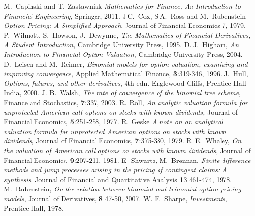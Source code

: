 \documentclass[letterpaper,12pt]{article}
\theoremstyle{plain}
\numberwithin{equation}{section}
\begin{document}
\begin{thebibliography}{99}

 M.~Capinski and T.~Zastawniak {\em Mathematics for Finance, An Introduction to Financial Engineering}, Springer, 2011.
 J.C.~Cox, S.A.~Ross and M.~Rubenstein {\em Option Pricing: A Simplified Approach}, Journal of Financial Economics 7, 1979.
 P.~Wilmott, S.~Howson, J.~Dewynne, {\em The Mathematics of Financial Derivatives, A Student Introduction}, Cambridge University Press, 1995.
 D. J.~Higham, {\em An Introduction to Financial Option Valuation}, Cambridge University Press, 2004.
 D.~Leisen and M.~Reimer, {\em Binomial models for option valuation, examining and improving convergence}, Applied Mathematical Finance, {\textbf 3}:319-346, 1996.
 J.~Hull, {\em Options, futures, and other derivatives}, 4th edn. Englewood Cliffs, Prentice Hall India, 2000.
 J. B.~Walsh, {\em The rate of convergence of the binomial tree scheme}, Finance and Stochastics, {\textbf 7}:337, 2003.
 R.~Roll, {\em An analytic valuation formula for unprotected American call
options on stocks with known dividends,} Journal of Financial Economics, {\textbf 5}:251-258, 1977.
 R.~Geske {\em A note on an analytical valuation formula for unprotected
American options on stocks with known dividends}, Journal of Financial Economics, {\textbf 7}:375-380, 1979.
 R. E.~Whaley, {\em On the valuation of American call options on stocks with known dividends}, Journal of Financial Economics, {\textbf 9}:207-211, 1981.
 E.~Shwartz, M.~Brennan, {\em Finite difference methods and jump processes arising in the pricing of contingent claims: A synthesis}, Journal of Financial and Quantitative Analysis {\textbf 13} 461-474, 1978.
 M.~Rubenstein, {\em On the relation between binomial and trinomial option pricing models}, Journal of Derivatives, {\textbf 8} 47-50, 2007.
 W. F.~Sharpe, {\em Investments}, Prentice Hall, 1978.


\end{thebibliography}
\end{document}
